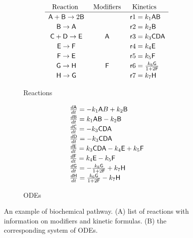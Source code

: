 \begin{figure}
\begin{subfigure}[b]{0.49\linewidth}
    \[\def\arraystretch{1.2}
    \begin{array}{ccl}
      \mbox{Reaction } & \mbox{ Modifiers } & \mbox{ Kinetics}\\
      \hline
      \SF{A} + \SF{B} \rightarrow 2\SF{B} &      & \SF{r}1 = k_1\SF{AB}\\
      \SF{B} \rightarrow \SF{A}      &      & \SF{r}2 = k_2\SF{B}\\
      \SF{C} + \SF{D} \rightarrow \SF{E}  & \SF{A}    & \SF{r}3 = k_3\SF{CDA}\\
      \SF{E} \rightarrow \SF{F}      &      & \SF{r}4 = k_4\SF{E}\\
      \SF{F} \rightarrow \SF{E}      &      & \SF{r}5 = k_5\SF{F}\\
      \SF{G} \rightarrow \SF{H}      & \SF{F}    & \SF{r}6 = \frac{k_6\SF{G}}{1+2 \SF{F}}\\
      \SF{H} \rightarrow \SF{G}      &      & \SF{r}7 = k_7\SF{H}\\
    \end{array}
    \]
\caption{Reactions}\label{subfig:example-reactions}
\end{subfigure}
%
\begin{subfigure}[b]{0.49\linewidth}
\[\def\arraystretch{1.2}
\begin{array}{l}
    \frac{d\SF{A}}{dt} = -k_1\SF{A}B + k_2\SF{B}\\
    \frac{d\SF{B}}{dt} = k_1\SF{AB} - k_2\SF{B}\\
    \frac{d\SF{C}}{dt} = -k_3\SF{CDA}\\
    \frac{d\SF{D}}{dt} = -k_3\SF{CDA}\\
    \frac{d\SF{E}}{dt} = k_3\SF{CDA} - k_4\SF{E} + k_5\SF{F}\\
    \frac{d\SF{F}}{dt} = k_4\SF{E} - k_5\SF{F}\\
    \frac{d\SF{G}}{dt} = -\frac{k_6\SF{G}}{1+2 \SF{F}} + k_7\SF{H}\\
    \frac{d\SF{H}}{dt} = \frac{k_6\SF{G}}{1+2 \SF{F}} - k_7\SF{H}
\end{array}
\]
\caption{ODEs}\label{subfig:example-odes}
\end{subfigure}
%
\caption{An example of biochemical pathway. ({\scriptsize A}) list of reactions with information on modifiers and kinetic formulas. ({\scriptsize B}) the corresponding system of ODEs.}\label{fig:example-pathway}
\end{figure}